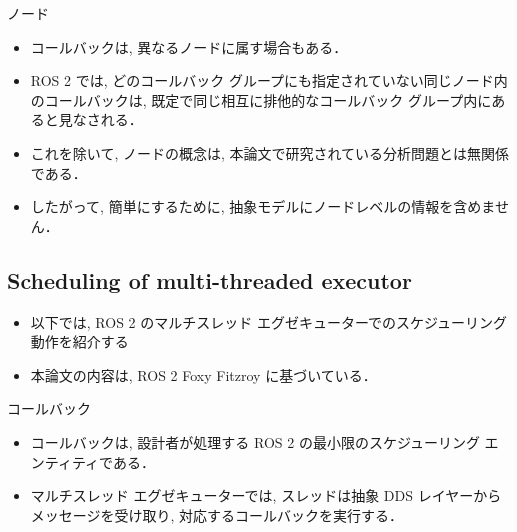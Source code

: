 \begin{frame}{ノード}
    \begin{itemize}
        \item コールバックは, 異なるノードに属す場合もある．
        \item ROS 2 では, どのコールバック グループにも指定されていない同じノード内のコールバックは, 既定で同じ相互に排他的なコールバック グループ内にあると見なされる．
        \item これを除いて, ノードの概念は, 本論文で研究されている分析問題とは無関係である．
        \item したがって, 簡単にするために, 抽象モデルにノードレベルの情報を含めません．
    \end{itemize}
\end{frame}


\subsection{Scheduling of multi-threaded executor}
\label{ssec: scheduling_of_multi_threaded_executor}

\begin{frame}{}
    \begin{itemize}
        \item 以下では, ROS 2 のマルチスレッド エグゼキューターでのスケジューリング動作を紹介する
        \item 本論文の内容は, ROS 2 Foxy Fitzroy に基づいている．
    \end{itemize}
\end{frame}

\begin{frame}{コールバック}
    \begin{itemize}
        \item コールバックは, 設計者が処理する ROS 2 の最小限のスケジューリング エンティティである．
        \item マルチスレッド エグゼキューターでは, スレッドは抽象 DDS レイヤーからメッセージを受け取り, 対応するコールバックを実行する．
    \end{itemize}
\end{frame}

